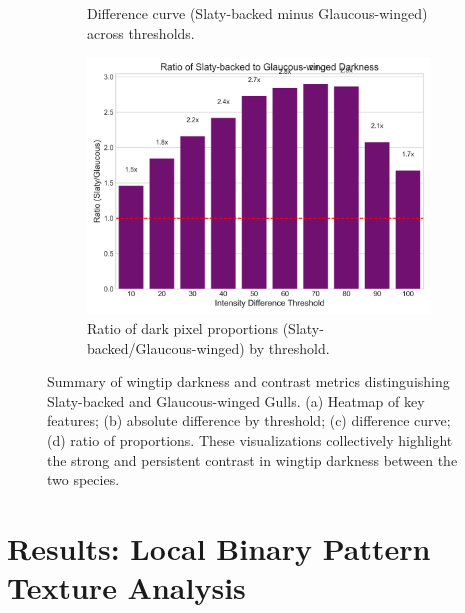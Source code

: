 \documentclass[a4paper,12pt]{report}
\begin{document}
\begin{figure}[H]
\begin{subfigure}[b]{0.48\textwidth}
        \caption{Difference curve (Slaty-backed minus Glaucous-winged) across thresholds.}
        \label{fig:diff_curve}
    \end{subfigure}
    \hfill
    \begin{subfigure}[b]{0.48\textwidth}
        \centering
        \includegraphics[width=\textwidth]{images/REPORT_IMAGES_INTENSITY/I1/ratiogwgsbgdarkness.png}
        \caption{Ratio of dark pixel proportions (Slaty-backed/Glaucous-winged) by threshold.}
        \label{fig:ratio_plot}
    \end{subfigure}
    \caption{Summary of wingtip darkness and contrast metrics distinguishing Slaty-backed and Glaucous-winged Gulls. (a) Heatmap of key features; (b) absolute difference by threshold; (c) difference curve; (d) ratio of proportions. These visualizations collectively highlight the strong and persistent contrast in wingtip darkness between the two species.}
    \label{fig:wingtip_darkness_summary}
\end{figure}

\section{Results: Local Binary Pattern Texture Analysis}
\label{sec:lbp_results}

\end{document}
